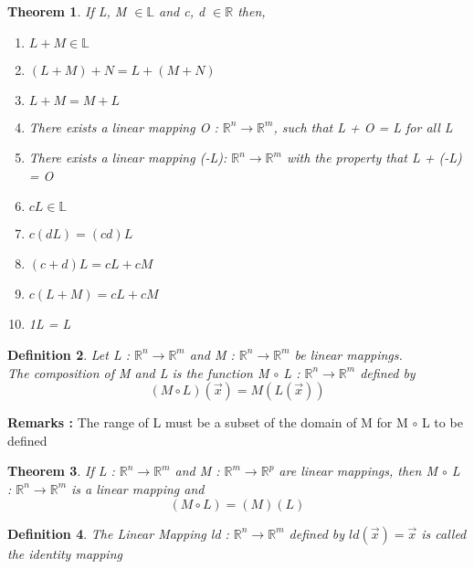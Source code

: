 \documentclass{article}
\newcounter{lecnum}
\newtheorem{theorem}{Theorem}[lecnum]
\newtheorem{definition}[theorem]{Definition}
\begin{document}
\begin{theorem} If L, M \( \in \mathbb{L}\) and c, d \( \in \mathbb{R}\) then, 
\begin{enumerate}
\item \( L + M \in \mathbb{L}\)
\item \( (L + M) + N = L + (M + N) \)
\item \( L + M = M + L \)
\item There exists a linear mapping O : \(\mathbb{R}^n \rightarrow \mathbb{R}^m\), such that L + O = L for all L 
\item There exists a linear mapping (-L): \(\mathbb{R}^n \rightarrow \mathbb{R}^m\) with the property that L + (-L) = O
\item \( cL \in \mathbb{L}\)
\item \(c(dL) = (cd)L \)
\item \( (c+d)L = cL + cM \) 
\item \( c(L+M) = cL + cM\)
\item 1L = L
\end{enumerate}
\end{theorem}

\newpage 

 \begin{definition}
Let L : \(\mathbb{R}^n \rightarrow \mathbb{R}^m\) and M : \(\mathbb{R}^n \rightarrow \mathbb{R}^m\) be linear mappings. \\
The composition of M and L is the function M \(\circ\) L : \(\mathbb{R}^n \rightarrow \mathbb{R}^m\) defined by 
\[(M \circ L ) (\vec{x}) = M (L(\vec{x}))\]
 \end{definition}
 
 \textbf{Remarks : } The range of L must be a subset of the domain of M for M \(\circ\) L to be defined 
 
 \begin{theorem}
 If L : \(\mathbb{R}^n \rightarrow \mathbb{R}^m\)  and M : \(\mathbb{R}^m \rightarrow \mathbb{R}^p\) are linear mappings, then M \( \circ \) L : \(\mathbb{R}^n \rightarrow \mathbb{R}^m\) is a linear mapping and
 \[ (M \circ L) = (M)(L) \]
 \end{theorem}
 
 \begin{definition}
The Linear Mapping ld : \(\mathbb{R}^n \rightarrow \mathbb{R}^m\) defined by \(ld(\vec{x}) = \vec{x}\) is called the identity mapping 
 \end{definition}
 
\end{document}
